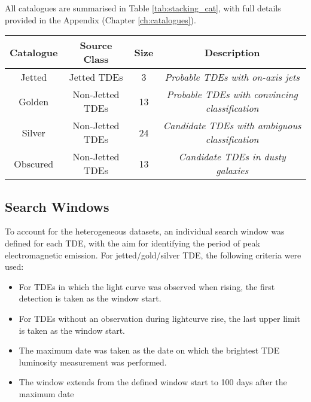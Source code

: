 All catalogues are summarised in Table \ref{tab:stacking_cat}, with full details provided in the Appendix (Chapter \ref{ch:catalogues}).

\begin{table*}[]
	\centering
	\begin{tabular}{||c c c c |} 
		\hline
		Catalogue & Source Class & Size & Description \\ [0.5ex] 
		\hline\hline
		Jetted & Jetted TDEs &  3 & \textit{Probable TDEs with on-axis jets}\\ 
		\hline
		Golden & Non-Jetted TDEs & 13 & \textit{Probable TDEs with convincing classification}\\
		\hline
		Silver & Non-Jetted TDEs & 24 & \textit{Candidate TDEs with ambiguous classification}\\
		\hline
		Obscured & Non-Jetted TDEs & 13 & \textit{Candidate TDEs in dusty galaxies}\\[1ex] 
		\hline
	\end{tabular}
	\caption{Summary of the four TDE catalogues..}
	\label{tab:stacking_cat}
\end{table*}{}

\subsection{Search Windows}

To account for the heterogeneous datasets, an individual search window was defined for each TDE, with the aim for identifying the period of peak electromagnetic emission. For jetted/gold/silver TDE, the following criteria were used:

\begin{itemize}
	\item For TDEs in which the light curve was observed when rising, the first detection is taken as the window start.
	
	\item For TDEs without an observation during lightcurve rise, the last upper limit is taken as the window start.
	
	\item The maximum date was taken as the date on which the brightest TDE luminosity measurement was performed.
	
	\item The window extends from the defined window start to 100 days after the maximum date
	
\end{itemize}

